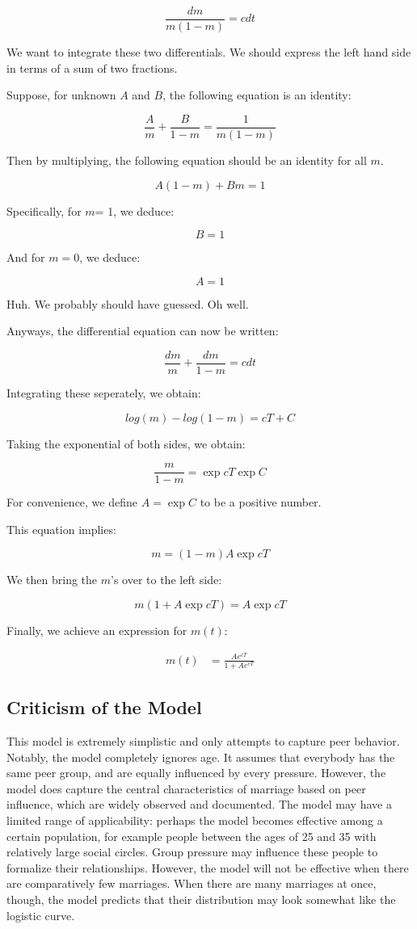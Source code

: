 \documentclass{article}
\begin{document}
\[ \frac{dm}{m(1-m)} = c dt \]

We want to integrate these two differentials.
We should express the left hand side in terms of a sum of two fractions.

Suppose, for unknown $A$ and $B$, the following equation is an identity:

\[ \frac{A}{m} + \frac{B}{1-m} = \frac{1}{m(1-m)} \]

Then by multiplying, the following equation should be an identity for all $m$.

\[ A(1-m) + B m = 1 \]

Specifically, for $m$= 1, we deduce:

\[ B = 1 \]

And for $m = 0$, we deduce:

\[ A = 1 \]

Huh.  We probably should have guessed.  Oh well.

Anyways, the differential equation can now be written:

\[ \frac{dm}{m} + \frac{dm}{1-m} = c dt \]

Integrating these seperately, we obtain:

\[ log(m) - log(1-m) = c T  + C\]

Taking the exponential of both sides, we obtain:

\[ \frac{m}{1-m} = \exp{c T}\exp{C} \]

For convenience, we define $A = \exp{C}$ to be a positive number.

This equation implies:

\[ m = (1 - m) A \exp{c T} \]

We then bring the $m$'s over to the left side:

\[ m ( 1 + A \exp{c T} ) = A \exp{c T} \]

Finally, we achieve an expression for $m(t)$:

\begin{align}
	m(t) & = \frac{A e^{c T}}{1 + A e^{c T}}
\end{align}



\subsection{Criticism of the Model}

This model is extremely simplistic and only attempts to capture
	peer behavior.
Notably, the model completely ignores age.
It assumes that everybody has the same peer group, and are equally
	influenced by every pressure.
However, the model does capture the central characteristics of marriage
	based on peer influence, which are widely observed and documented.
The model may have a limited range of applicability:
	perhaps the model becomes effective among a certain population,
	for example people between the ages of 25 and 35 with relatively
	large social circles.
Group pressure may influence these people to formalize their relationships.
However, the model will not be effective when there are comparatively few
	marriages.
When there are many marriages at once, though, the model predicts that
	their distribution may look somewhat like the logistic curve.
\end{document}
